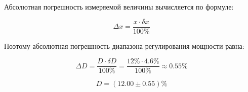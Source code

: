 Абсолютная погрешность измеряемой величины вычисляется по формуле:

\begin{equation}
	\Delta x = \frac{x \cdot \delta x}{100 \%}
\end{equation}

Поэтому абсолютная погрешность диапазона регулирования мощности равна:

\begin{displaymath}
	\Delta D = \frac{D \cdot \delta D}{100 \%} = \frac{12 \% \cdot 4.6 \%}{100 \%} \approx 0.55 \%
\end{displaymath}

\begin{displaymath}
	D = (12.00 \pm 0.55) \% 
\end{displaymath}


